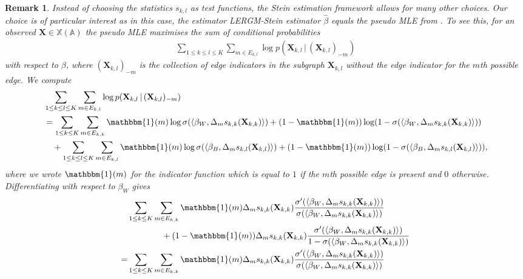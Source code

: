 \documentclass{article}
\newtheorem{Remark}[Theorem]{Remark}
\begin{document}
\begin{Remark} 
    Instead of choosing the statistics $s_{k,l}$ as test functions, the Stein estimation framework allows for many other choices. Our choice is of particular interest as in this case, the estimator LERGM-Stein estimator $\hat{\beta}$ equals the pseudo MLE from \cite{stewart2026pseudo}. To see this, for an observed $\mathbf{X} \in \mathbb{X}(\mathbb{A})$ the pseudo MLE maximises the sum of conditional probabilities
    \begin{align*}
        \sum_{1 \leq k \leq l \leq K} \sum_{m \in E_{k,l}} \log p( \mathbf{X}_{k,l} \, \vert \, (\mathbf{X}_{k,l})_{-m} ) 
    \end{align*}
    with respect to $\beta$, where $(\mathbf{X}_{k,l})_{-m} $ is the collection of edge indicators in the subgraph $\mathbf{X}_{k,l}$ without the edge indicator for the $m$th possible edge. We compute
    \begin{align*}
        &\sum_{1 \leq k \leq l \leq K}  \sum_{m \in E_{k,l}} \log p( \mathbf{X}_{k,l} \, \vert \, (\mathbf{X}_{k,l})_{-m} ) \\
         &= \sum_{1 \leq k \leq K} \sum_{m \in E_{k,k}} \mathbbm{1}(m) \log \sigma(\langle \beta_{W}, \Delta_m s_{k,k}(\mathbf{X}_{k,k}) \rangle )  + (1-\mathbbm{1}(m)) \log (1- \sigma(\langle \beta_{W}, \Delta_m s_{k,k}(\mathbf{X}_{k,k}) \rangle ) ) \\
         & \quad + \sum_{1 \leq k \leq l \leq K} \sum_{m \in E_{k,l}} \mathbbm{1}(m) \log \sigma(\langle \beta_{B}, \Delta_m s_{k,l}(\mathbf{X}_{k,l}) \rangle )  + (1-\mathbbm{1}(m)) \log (1- \sigma(\langle \beta_{B}, \Delta_m s_{k,l}(\mathbf{X}_{k,l}) \rangle ) ),
    \end{align*}
     where we wrote $\mathbbm{1}(m)$ for the indicator function which is equal to $1$ if the $m$th possible edge is present and $0$ otherwise. Differentiating with respect to $\beta_W$ gives
    \begin{align*}
        & \sum_{1 \leq k  \leq K} \sum_{m \in E_{k,k}} \mathbbm{1}(m) \Delta_m s_{k,k}(\mathbf{X}_{k,k}) \frac{\sigma'(\langle \beta_W, \Delta_m s_{k,k}(\mathbf{X}_{k,k}) \rangle )}{\sigma(\langle \beta_W, \Delta_m s_{k,k}(\mathbf{X}_{k,k}) \rangle )}  \\
        & \qquad \qquad + (1-\mathbbm{1}(m)) \Delta_m s_{k,k}(\mathbf{X}_{k,k}) \frac{\sigma'(\langle \beta_W, \Delta_m s_{k,k}(\mathbf{X}_{k,k}) \rangle )}{1-\sigma(\langle \beta_W, \Delta_m s_{k,k}(\mathbf{X}_{k,k}) \rangle )} \\
        =& \sum_{1 \leq k \leq K} \sum_{m \in E_{k,k}} \mathbbm{1}(m) \Delta_m s_{k,k}(\mathbf{X}_{k,k}) \frac{\sigma'(\langle \beta_W, \Delta_m s_{k,k}(\mathbf{X}_{k,k}) \rangle )}{\sigma(\langle \beta_W, \Delta_m s_{k,k}(\mathbf{X}_{k,k}) \rangle )}  \\

\end{align*}
\end{Remark}
\end{document}
